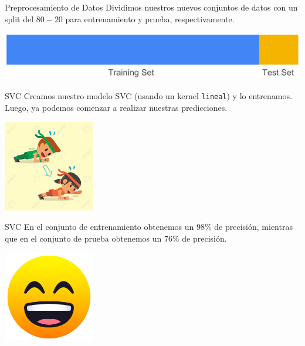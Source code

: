 \documentclass[11pt]{beamer}
\begin{document}
\begin{frame}{Preprocesamiento de Datos}
    Dividimos nuestros nuevos conjuntos de datos con un split del $80-20$ para 
    entrenamiento y prueba, respectivamente.
    \begin{center}
        \includegraphics[width=1\textwidth]{imagenes/train-test.png}
    \end{center}
\end{frame}


\begin{frame}{SVC}
\justifying
Creamos nuestro modelo SVC (usando un kernel \texttt{lineal}) y lo entrenamos.
Luego, ya podemos comenzar a realizar nuestras predicciones.
\lstI
\begin{center}
    \includegraphics[width=0.3\textwidth]{imagenes/entrenamiento.jpg}
\end{center}
\end{frame}

\begin{frame}{SVC}
\justifying
En el conjunto de entrenamiento obtenemos un $98\%$ de precisión, mientras que 
en el conjunto de prueba obtenemos un $76\%$ de precisión.
\begin{center}
    \includegraphics[width=0.3\textwidth]{imagenes/feliz.png}
\end{center}
\end{frame}
\end{document}
